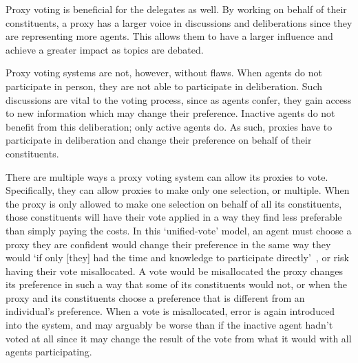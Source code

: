 Proxy voting is beneficial for the delegates as well.
By working on behalf of their constituents, a proxy has a larger voice in discussions
and deliberations since they are representing more agents.
This allows them to have a larger influence and achieve a greater impact as topics
are debated.

Proxy voting systems are not, however, without flaws.
When agents do not participate in person, they are not able to participate in
deliberation.
Such discussions are vital to the voting process, since as agents confer, they gain
access to new information which may change their preference.
Inactive agents do not benefit from this deliberation; only active agents do.
As such, proxies have to participate in deliberation and change their preference on
behalf of their constituents.

There are multiple ways a proxy voting system can allow its proxies to
vote.
Specifically, they can allow proxies to make only one selection, or multiple.
When the proxy is only allowed to make one selection on behalf of all its
constituents, those constituents will have their vote applied in a way they find less
preferable than simply paying the costs.
In this `unified-vote' model, an agent must choose a proxy they are confident would
change their preference in the same way they would `if only [they] had the time and
knowledge to participate directly'~\cite{Miller1969}, or risk having their vote
misallocated.
A vote would be misallocated the proxy changes its preference in such a way that some
of its constituents would not, or when the proxy and its constituents choose a
preference that is different from an individual's preference.
When a vote is misallocated, error is again introduced into the system, and may
arguably be worse than if the inactive agent hadn't voted at all since it may change
the result of the vote from what it would with all agents participating.

